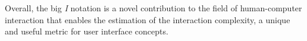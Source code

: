 Overall, the big \textit{I} notation is a novel contribution to the field of human-computer interaction that enables the estimation of the interaction complexity, a unique and useful metric for user interface concepts.   

%
%
